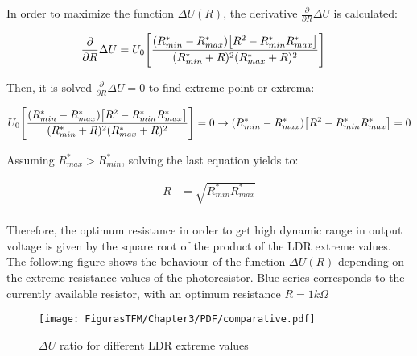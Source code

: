 In order to maximize the function $\Delta U(R)$, the derivative $\frac{\partial}{\partial R} \Delta U $ is calculated:

\begin{align*}
\centering
\frac{\partial}{\partial R} \Delta U &= U_0\Bigg[\frac{(R^*_{min} - R^*_{max})\big[R^2-R^*_{min}R^*_{max}\big]}{(R^*_{min} + R)^2(R^*_{max} + R)^2}\Bigg]
\end{align*} %

Then, it is solved $\frac{\partial}{\partial R} \Delta U = 0$ to find extreme point or extrema:

\begin{align*}
\centering
U_0\Bigg[\frac{(R^*_{min} - R^*_{max})\big[R^2-R^*_{min}R^*_{max}\big]}{(R^*_{min} + R)^2(R^*_{max} + R)^2}\Bigg] =  0 \rightarrow 
(R^*_{min} - R^*_{max})\big[R^2-R^*_{min}R^*_{max}\big] =  0
\end{align*} %

Assuming $R^*_{max}>R^*_{min}$, solving the last equation yields to:

\begin{align*}
R &= \sqrt{R^*_{min}R^*_{max}} \\
\end{align*} %


Therefore, the optimum resistance in order to get high dynamic range in output voltage is given by the square root of the product of the LDR extreme values. The following figure shows the behaviour of the function $\Delta U(R)$ depending on the extreme resistance values of the photoresistor. Blue series corresponds to the currently available resistor, with an optimum resistance $ R = 1 k \Omega $


	
  	\begin{figure}[H]
			\centering
			\texttt{[image: FigurasTFM/Chapter3/PDF/comparative.pdf]}
			\caption{$\Delta{U}$ ratio for different LDR extreme values}      		
		\end{figure}